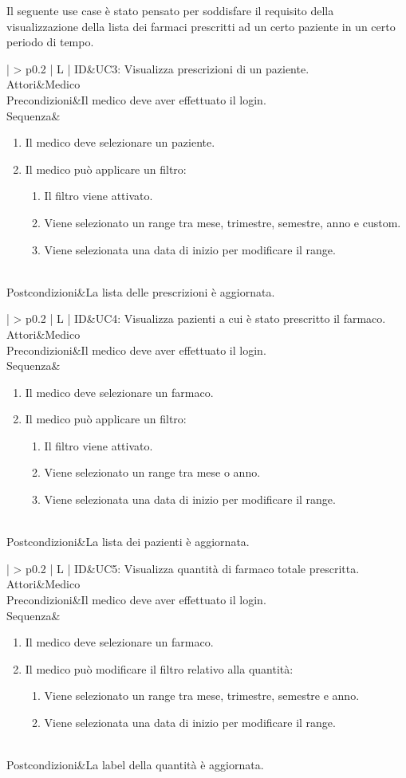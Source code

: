 \documentclass[a4paper, 11pt]{article}
\newcommand{\usecase}[5]{%
\begin{table}[H]
	\centering
	\renewcommand{\familydefault}{\ttdefault}\normalfont
\begin{tabular}{| >{\fontseries{b}\selectfont} p{0.2\textwidth} | L |}
	\hline
	ID&{#1}\\\hline
	Attori&{#2}\\\hline
	Precondizioni&{#3}\\\hline
	Sequenza&{#4}\\\hline
	Postcondizioni&{#5}\\\hline
\end{tabular}
\end{table}

}
\begin{document}
Il seguente use case è stato pensato per soddisfare il requisito della visualizzazione della lista dei farmaci prescritti ad un certo paziente in un certo periodo di tempo.
\usecase{UC3: Visualizza prescrizioni di un paziente.}
{Medico}
{Il medico deve aver effettuato il login.}
{
	\begin{enumerate}[label*=\arabic*., nosep]
		\item Il medico deve selezionare un paziente.
		\item Il medico può applicare un filtro:
		\begin{enumerate}[label*=\arabic*., nosep]
			\item Il filtro viene attivato.
			\item Viene selezionato un range tra mese, trimestre, semestre, anno e custom.
			\item Viene selezionata una data di inizio per modificare il range.
		\end{enumerate}
\end{enumerate}
}
{La lista delle prescrizioni è aggiornata.}


\usecase{UC4: Visualizza pazienti a cui è stato prescritto il farmaco.}
{Medico}
{Il medico deve aver effettuato il login.}
{\begin{enumerate}[label*=\arabic*., nosep]
		\item Il medico deve selezionare un farmaco.
		\item Il medico può applicare un filtro:
		\begin{enumerate}[label*=\arabic*., nosep]
			\item Il filtro viene attivato.
			\item Viene selezionato un range tra mese o anno.
			\item Viene selezionata una data di inizio per modificare il range.
		\end{enumerate}
\end{enumerate}}
{La lista dei pazienti è aggiornata.}

\usecase{UC5: Visualizza quantità di farmaco totale prescritta.}
{Medico}
{Il medico deve aver effettuato il login.}
{\begin{enumerate}[label*=\arabic*., nosep]
		\item Il medico deve selezionare un farmaco.
		\item Il medico può modificare il filtro relativo alla quantità:
		\begin{enumerate}[label*=\arabic*., nosep]
			\item Viene selezionato un range tra mese, trimestre, semestre e anno.
			\item Viene selezionata una data di inizio per modificare il range.
		\end{enumerate}
\end{enumerate}}
{La label della quantità è aggiornata.}
\end{document}
